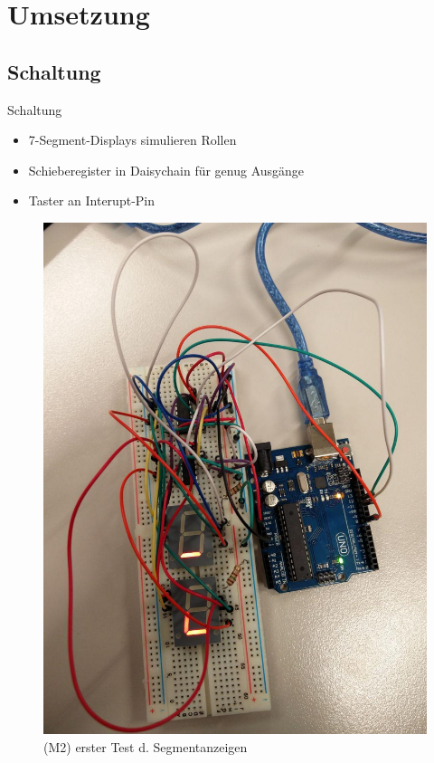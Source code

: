 \documentclass[mathserif,9pt]{article}
\begin{document}
    \section{Umsetzung}
    \subsection{Schaltung}
    \begin{frame}{Schaltung}
        \begin{block}{}
            \begin{minipage}[c]{0.6\textwidth}
                \begin{itemize}
                    \item 7-Segment-Displays simulieren Rollen
                    \item Schieberegister in Daisychain für genug Ausgänge
                    \item Taster an Interupt-Pin 
                \end{itemize}
            \end{minipage}
            \hfill
            \begin{minipage}[c]{0.3\textwidth}
               \begin{figure}
                    \includegraphics[width=\textwidth]{img/breadboard.jpg}
                    \caption[M2]{(M2) erster Test d. Segmentanzeigen}
                    \label{fig:breadboard}
               \end{figure}
            \end{minipage}
        \end{block}
    \end{frame}
\end{document}
